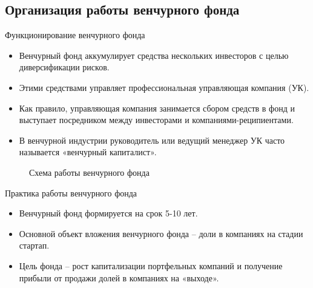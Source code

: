 \documentclass[_Venture_p1.tex]{subfiles}
\begin{document}

\subsection{Организация работы венчурного фонда}
\begin{frame}{Функционирование венчурного фонда}
\begin{itemize}
	\small
	\item Венчурный фонд аккумулирует средства нескольких инвесторов с целью диверсификации рисков. 
	\item Этими средствами управляет профессиональная управляющая компания (УК). 
	\item Как правило, управляющая компания занимается сбором средств в фонд и выступает посредником между инвесторами и компаниями-реципиентами. 
	\item В венчурной индустрии руководитель или ведущий менеджер УК часто называется «венчурный капиталист».
\end{itemize}
\end{frame}

\begin{frame}{}
\begin{overprint}
\begin{figure}
	\centering
	\caption{Схема работы венчурного фонда}
\end{figure}
\end{overprint}
\end{frame}

\begin{frame}{Практика работы венчурного фонда}
\begin{itemize}
	\item Венчурный фонд формируется на срок 5-10 лет. 
	\item Основной объект вложения венчурного фонда – доли в компаниях на стадии стартап. 
	\item Цель фонда – рост капитализации портфельных компаний и получение прибыли от продажи долей в компаниях на «выходе».
\end{itemize}
\end{frame}
\end{document}
